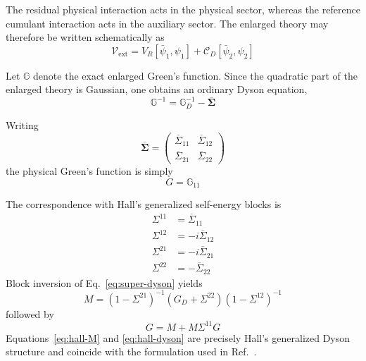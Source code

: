 \documentclass[aip,jcp,reprint,noshowkeys,superscriptaddress]{revtex4-1}
\begin{document}
The residual physical interaction acts in the physical sector, whereas
the reference cumulant interaction acts in the auxiliary sector.  The
enlarged theory may therefore be written schematically as
\begin{equation}
  \mathcal V_{\mathrm{ext}}
  =
  V_R[\bar\psi_1,\psi_1]
  +
  \mathcal C_D[\bar\psi_2,\psi_2]
  \label{eq:extended-interaction}
\end{equation}

Let $\mathbb G$ denote the exact enlarged Green's function.  Since the
quadratic part of the enlarged theory is Gaussian, one obtains an
ordinary Dyson equation,
\begin{equation}
  \mathbb G^{-1}
  =
  \mathbb G_D^{-1}
  -
  \overline{\boldsymbol\Sigma}
  \label{eq:super-dyson}
\end{equation}

Writing
\begin{equation}
  \overline{\boldsymbol\Sigma}
  =
  \begin{pmatrix}
    \overline\Sigma_{11} &
    \overline\Sigma_{12}
    \\
    \overline\Sigma_{21} &
    \overline\Sigma_{22}
  \end{pmatrix}
\end{equation}
the physical Green's function is simply
\begin{equation}
  G = \mathbb G_{11}
\end{equation}

The correspondence with Hall's generalized self-energy blocks is
\begin{subequations}
  \label{eq:hall-mapping}
  \begin{align}
    \Sigma^{11}
    &=
    \overline\Sigma_{11}
    \\
    \Sigma^{12}
    &=
    -i \overline\Sigma_{12}
    \\
    \Sigma^{21}
    &=
    -i \overline\Sigma_{21}
    \\
    \Sigma^{22}
    &=
    -\overline\Sigma_{22}
  \end{align}
\end{subequations}
Block inversion of Eq.~\eqref{eq:super-dyson} yields
\begin{equation}
  M
  =
  (1-\Sigma^{21})^{-1}
  \left(
    G_D+\Sigma^{22}
  \right)
  (1-\Sigma^{12})^{-1}
  \label{eq:hall-M}
\end{equation}
followed by
\begin{equation}
  G
  =
  M
  +
  M\Sigma^{11}G
  \label{eq:hall-dyson}
\end{equation}
Equations~\eqref{eq:hall-M} and \eqref{eq:hall-dyson} are precisely
Hall's generalized Dyson structure and coincide with the formulation
used in Ref.~\cite{WangFangLi2026}.
\end{document}
